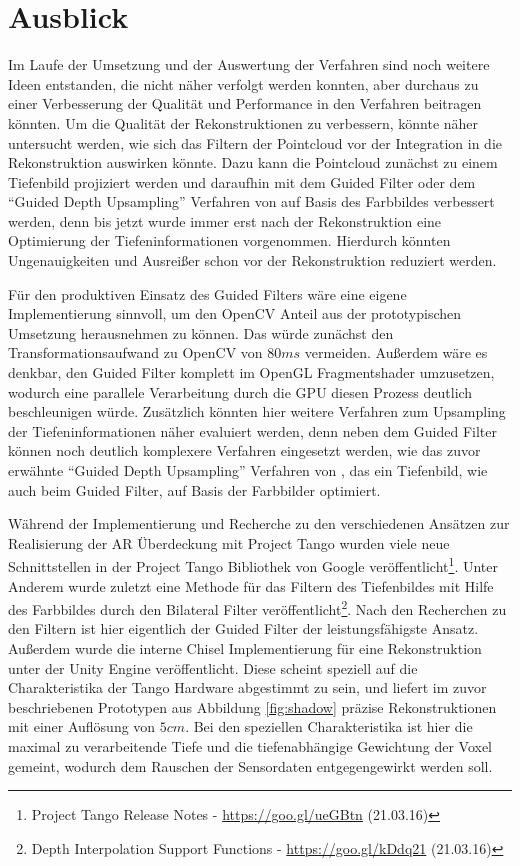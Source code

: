 \section{Ausblick}

Im Laufe der Umsetzung und der Auswertung der Verfahren sind noch weitere Ideen entstanden, die nicht näher verfolgt werden konnten, aber durchaus zu einer Verbesserung der Qualität und Performance in den Verfahren beitragen könnten. Um die Qualität der Rekonstruktionen zu verbessern, könnte näher untersucht werden, wie sich das Filtern der Pointcloud vor der Integration in die Rekonstruktion auswirken könnte. Dazu kann die Pointcloud zunächst zu einem Tiefenbild projiziert werden und daraufhin mit dem Guided Filter oder dem \enquote{Guided Depth Upsampling} Verfahren von \citet{Ferstl_2013_ICCV} auf Basis des Farbbildes verbessert werden, denn bis jetzt wurde immer erst nach der Rekonstruktion eine Optimierung der Tiefeninformationen vorgenommen. Hierdurch könnten Ungenauigkeiten und Ausreißer schon vor der Rekonstruktion reduziert werden. 

Für den produktiven Einsatz des Guided Filters wäre eine eigene Implementierung sinnvoll, um den OpenCV Anteil aus der prototypischen Umsetzung herausnehmen zu können. Das würde zunächst den Transformationsaufwand zu OpenCV von \(80 ms\) vermeiden. Außerdem wäre es denkbar, den Guided Filter komplett im OpenGL Fragmentshader umzusetzen, wodurch eine parallele Verarbeitung durch die GPU diesen Prozess deutlich beschleunigen würde. Zusätzlich könnten hier weitere Verfahren zum Upsampling der Tiefeninformationen näher evaluiert werden, denn neben dem Guided Filter können noch deutlich komplexere Verfahren eingesetzt werden, wie das zuvor erwähnte \enquote{Guided Depth Upsampling} Verfahren von \citet{Ferstl_2013_ICCV}, das ein Tiefenbild, wie auch beim Guided Filter, auf Basis der Farbbilder optimiert. 

Während der Implementierung und Recherche zu den verschiedenen Ansätzen zur Realisierung der AR Überdeckung mit Project Tango wurden viele neue Schnittstellen in der Project Tango Bibliothek von Google veröffentlicht\footnote{Project Tango Release Notes - \url{https://goo.gl/ueGBtn} (21.03.16)}.  Unter Anderem wurde zuletzt eine Methode für das Filtern des Tiefenbildes mit Hilfe des Farbbildes durch den Bilateral Filter veröffentlicht\footnote{Depth Interpolation Support Functions - \url{https://goo.gl/kDdq21} (21.03.16)}. Nach den Recherchen zu den Filtern ist hier eigentlich der Guided Filter der leistungsfähigste Ansatz. Außerdem wurde die interne Chisel Implementierung für eine Rekonstruktion unter der Unity Engine veröffentlicht. Diese scheint speziell auf die Charakteristika der Tango Hardware abgestimmt zu sein, und liefert im zuvor beschriebenen Prototypen aus Abbildung \ref{fig:shadow} präzise Rekonstruktionen mit einer Auflösung von \(5cm\). Bei den speziellen Charakteristika ist hier die maximal zu verarbeitende Tiefe und die tiefenabhängige Gewichtung der Voxel gemeint, wodurch dem Rauschen der Sensordaten entgegengewirkt werden soll.

